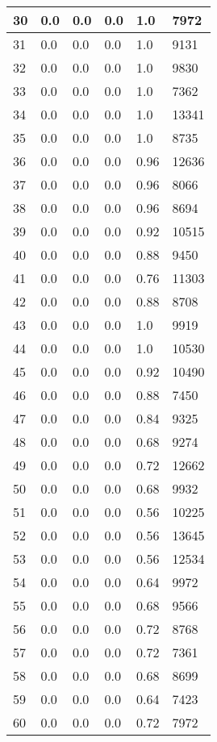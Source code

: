 \begin{longtable}{|l|l|l|l|l|l|}
30 & 0.0 & 0.0 & 0.0 & 1.0 & 7972 \\ \hline 
31 & 0.0 & 0.0 & 0.0 & 1.0 & 9131 \\ \hline 
32 & 0.0 & 0.0 & 0.0 & 1.0 & 9830 \\ \hline 
33 & 0.0 & 0.0 & 0.0 & 1.0 & 7362 \\ \hline 
34 & 0.0 & 0.0 & 0.0 & 1.0 & 13341 \\ \hline 
35 & 0.0 & 0.0 & 0.0 & 1.0 & 8735 \\ \hline 
36 & 0.0 & 0.0 & 0.0 & 0.96 & 12636 \\ \hline 
37 & 0.0 & 0.0 & 0.0 & 0.96 & 8066 \\ \hline 
38 & 0.0 & 0.0 & 0.0 & 0.96 & 8694 \\ \hline 
39 & 0.0 & 0.0 & 0.0 & 0.92 & 10515 \\ \hline 
40 & 0.0 & 0.0 & 0.0 & 0.88 & 9450 \\ \hline 
41 & 0.0 & 0.0 & 0.0 & 0.76 & 11303 \\ \hline 
42 & 0.0 & 0.0 & 0.0 & 0.88 & 8708 \\ \hline 
43 & 0.0 & 0.0 & 0.0 & 1.0 & 9919 \\ \hline 
44 & 0.0 & 0.0 & 0.0 & 1.0 & 10530 \\ \hline 
45 & 0.0 & 0.0 & 0.0 & 0.92 & 10490 \\ \hline 
46 & 0.0 & 0.0 & 0.0 & 0.88 & 7450 \\ \hline 
47 & 0.0 & 0.0 & 0.0 & 0.84 & 9325 \\ \hline 
48 & 0.0 & 0.0 & 0.0 & 0.68 & 9274 \\ \hline 
49 & 0.0 & 0.0 & 0.0 & 0.72 & 12662 \\ \hline 
50 & 0.0 & 0.0 & 0.0 & 0.68 & 9932 \\ \hline 
51 & 0.0 & 0.0 & 0.0 & 0.56 & 10225 \\ \hline 
52 & 0.0 & 0.0 & 0.0 & 0.56 & 13645 \\ \hline 
53 & 0.0 & 0.0 & 0.0 & 0.56 & 12534 \\ \hline 
54 & 0.0 & 0.0 & 0.0 & 0.64 & 9972 \\ \hline 
55 & 0.0 & 0.0 & 0.0 & 0.68 & 9566 \\ \hline 
56 & 0.0 & 0.0 & 0.0 & 0.72 & 8768 \\ \hline 
57 & 0.0 & 0.0 & 0.0 & 0.72 & 7361 \\ \hline 
58 & 0.0 & 0.0 & 0.0 & 0.68 & 8699 \\ \hline 
59 & 0.0 & 0.0 & 0.0 & 0.64 & 7423 \\ \hline 
60 & 0.0 & 0.0 & 0.0 & 0.72 & 7972 \\ \hline 

\end{longtable}
